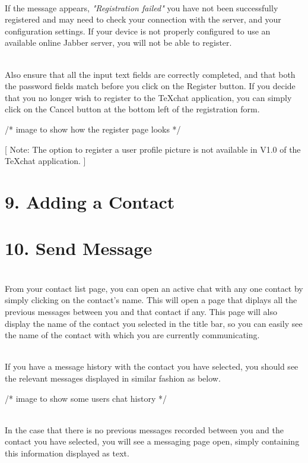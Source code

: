 \documentclass[29pt,a4paper]{moderncv}
\begin{document}
		\\If the message appears, \textit{"Registration failed"} you have not been successfully registered and may need to check your connection with the server, and your configuration settings.  If your device is not properly configured to use an available online Jabber server, you will not be able to register.
		
		\\Also ensure that all the input text fields are correctly completed, and that both the password fields match before you click on the Register button.  If you decide that you no longer wish to register to the TeXchat application, you can simply click on the Cancel button at the bottom left of the registration form.
		
		/* image to show how the register page looks */ 
		
		[ Note: The option to register a user profile picture is not available in V1.0 of the TeXchat application. ]
		\vspace{4mm}
		
		\section*{9. Adding a Contact}
				\vspace{5mm}
				\vspace{4mm}
				
		\section*{10. Send Message}
				\vspace{5mm}
				\\From your contact list page, you can open an active chat with any one contact by simply clicking on the contact’s name.  This will open a page that diplays all the previous messages between you and that contact if any.  This page will also display the name of the contact you selected in the title bar, so you can easily see the name of the contact with which you are currently communicating.
				
				\\If you have a message history with the contact you have selected, you should see the relevant messages displayed in similar fashion as below.
				
				/* image to show some users chat history */
				
				\\In the case that there is no previous messages recorded between you and the contact you have selected, you will see a messaging page open, simply containing this information displayed as text.
				
\end{document}

